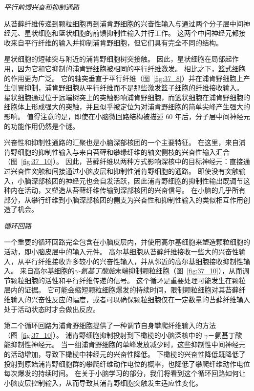 \textit{平行前馈兴奋和抑制通路}


从苔藓纤维传递到颗粒细胞再到浦肯野细胞的兴奋性输入与通过两个分子层中间神经元、星状细胞和篮状细胞的前馈抑制性输入并行工作。
这两个中间神经元都接收来自平行纤维的输入并抑制浦肯野细胞，但它们具有完全不同的结构。


星状细胞的短轴突与附近的浦肯野细胞树突接触。
因此，星状细胞在局部起作用，因为它和它抑制的浦肯野细胞被相同的平行纤维激发。
相比之下，篮式细胞的作用更为广泛。 它的轴突垂直于平行纤维（图~\ref{fig:37_8}）并在浦肯野细胞上产生侧翼抑制，浦肯野细胞从平行纤维而不是那些激发篮子细胞的纤维接收输入。
星状细胞通过位于远端树突上的突触影响浦肯野细胞，而篮状细胞在浦肯野细胞的细胞体上形成强大的突触，并且似乎被定位为对浦肯野细胞的简单尖峰产生强大的影响。
值得注意的是，即使在小脑微回路结构被描述 60 年后，分子层中间神经元的功能作用仍然是个谜。


兴奋性和抑制性通路的汇聚也是小脑深部核团的一个主要特征。
在这里，来自浦肯野细胞的抑制性输入与来自苔藓和攀缘纤维的轴突侧枝的兴奋性输入汇合（图~\ref{fig:37_10}）。
因此，苔藓纤维以两种方式影响深核中的目标神经元：直接通过兴奋性突触和间接通过小脑皮层和抑制性浦肯野细胞的通路。
即使没有突触输入，小脑深部核团的神经元也会自发活跃，因此浦肯野细胞的抑制性输出既调节这种内在活动，又塑造从苔藓纤维传输到深部核团的兴奋信号。
在小脑的几乎所有部分，从攀行纤维到小脑深部核团的侧支为兴奋性和抑制性输入的类似相互作用创造了机会。



\textit{循环回路}

一个重要的循环回路完全包含在小脑皮层内，并使用高尔基细胞来塑造颗粒细胞的活动，即小脑皮层中的输入元件。
高尔基细胞从苔藓纤维接收一些大的兴奋性输入，从平行纤维接收许多较小的兴奋性输入，并从邻近的高尔基细胞接收抑制性输入。
来自高尔基细胞的\textit{$\gamma$-氨基丁酸能}末端抑制颗粒细胞（图~\ref{fig:37_10}），从而调节颗粒细胞的活性和平行纤维传递的信号。
这个循环是重要处理可能发生在颗粒层内的证据。
它可能会缩短颗粒细胞爆发的持续时间，限制颗粒细胞对其苔藓纤维输入的兴奋性反应的幅度，或者可以确保颗粒细胞仅在一定数量的苔藓纤维输入处于活动状态时才会做出反应。


第二个循环回路为浦肯野细胞提供了一种调节自身攀爬纤维输入的方法（图~\ref{fig:37_10}）。
浦肯野细胞抑制投射到下橄榄的小脑深核中的 $\gamma$－氨基丁酸 能抑制性神经元。
当一组浦肯野细胞的单峰发放减少时，这些抑制性中间神经元的活动增加，导致下橄榄中神经元的兴奋性降低。
下橄榄的兴奋性降低既降低了投射到原始浦肯野细胞群的攀爬纤维动作电位的概率，也降低了攀爬纤维动作电位每次爆发的持续时间。
在关于小脑学习的部分，我们将看到这个循环回路如何让小脑皮层控制输入，从而导致其浦肯野细胞突触发生适应性变化。



